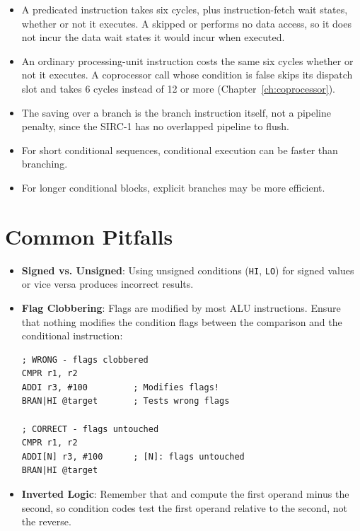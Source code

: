 \begin{itemize}
	\item A predicated instruction takes six cycles, plus instruction-fetch wait states, whether or not it executes. A skipped
	       or  performs no data access, so it does not incur the data wait states it would incur
	      when executed.
	\item An ordinary processing-unit instruction costs the same six cycles whether or not it executes. A coprocessor call whose
	      condition is false skips its dispatch slot and takes 6 cycles instead of 12 or more (Chapter~\ref{ch:coprocessor}).
	\item The saving over a branch is the branch instruction itself, not a pipeline penalty, since the SIRC-1 has no overlapped
	      pipeline to flush.
	\item For short conditional sequences, conditional execution can be faster than branching.
	\item For longer conditional blocks, explicit branches may be more efficient.
\end{itemize}

\section{Common Pitfalls}

\begin{itemize}
	\item \textbf{Signed vs. Unsigned}: Using unsigned conditions (\texttt{HI}, \texttt{LO}) for signed values or vice versa produces incorrect results.

	\item \textbf{Flag Clobbering}: Flags are modified by most ALU instructions. Ensure that nothing modifies the condition flags between the comparison and the conditional instruction:

	      \begin{lstlisting}
; WRONG - flags clobbered
CMPR r1, r2
ADDI r3, #100         ; Modifies flags!
BRAN|HI @target       ; Tests wrong flags

; CORRECT - flags untouched
CMPR r1, r2
ADDI[N] r3, #100      ; [N]: flags untouched
BRAN|HI @target
\end{lstlisting}

	\item \textbf{Inverted Logic}: Remember that  and  compute the first operand minus the second, so condition codes test the first operand relative to the second, not the reverse.
\end{itemize}
